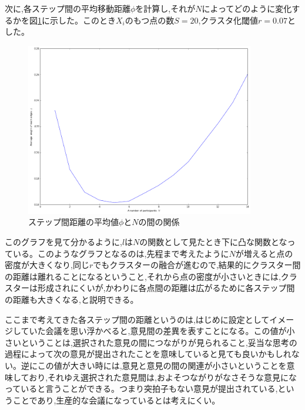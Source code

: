 次に,各ステップ間の平均移動距離$\phi$を計算し,それが$N$によってどのように変化するかを図\ref{fig:f24}に示した。このとき$X_{i}$のもつ点の数$S=20$,クラスタ化閾値$r=0.07$とした。
\begin{figure}[H]
    \begin{center}
        \includegraphics[width=10cm]{../img/N_l_2.png}
        \caption{ステップ間距離の平均値$\phi$と$N$の間の関係}
        \label{fig:f24}
    \end{center}
\end{figure}
このグラフを見て分かるように,$l$は$N$の関数として見たとき下に凸な関数となっている。このようなグラフとなるのは,先程まで考えたように$N$が増えると点の密度が大きくなり,同じ$r$でもクラスターの融合が進むので,結果的にクラスター間の距離は離れることになるということ,それから点の密度が小さいときには,クラスターは形成されにくいが,かわりに各点間の距離は広がるために各ステップ間の距離も大きくなる,と説明できる。

ここまで考えてきた各ステップ間の距離というのは,はじめに設定としてイメージしていた会議を思い浮かべると,意見間の差異を表すことになる。この値が小さいということは,選択された意見の間につながりが見られること,妥当な思考の過程によって次の意見が提出されたことを意味していると見ても良いかもしれない。逆にこの値が大きい時には,意見と意見の間の関連が小さいということを意味しており,それゆえ選択された意見間は,およそつながりがなさそうな意見になっていると言うことができる。つまり突拍子もない意見が提出されている,ということであり,生産的な会議になっているとは考えにくい。
